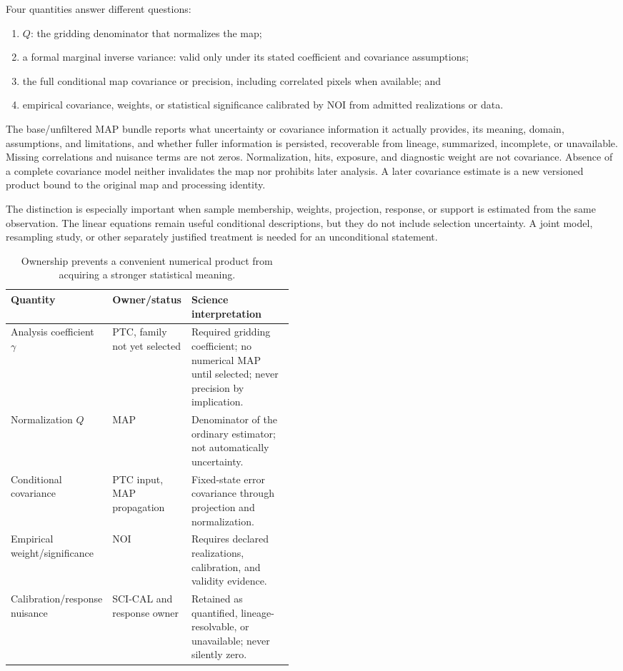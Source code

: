 \documentclass[10pt]{article}
\begin{document}
Four quantities answer different questions:
\begin{enumerate}
\item \(Q\): the gridding denominator that normalizes the map;
\item a formal marginal inverse variance: valid only under its stated
coefficient and covariance assumptions;
\item the full conditional map covariance or precision, including correlated
pixels when available; and
\item empirical covariance, weights, or statistical significance calibrated
by NOI from admitted realizations or data.
\end{enumerate}

The base/unfiltered MAP bundle reports what uncertainty or covariance information it
actually provides, its meaning, domain, assumptions, and limitations, and
whether fuller information is persisted, recoverable from lineage,
summarized, incomplete, or unavailable. Missing correlations and nuisance
terms are not zeros. Normalization, hits, exposure, and diagnostic weight are
not covariance. Absence of a complete covariance model neither invalidates the
map nor prohibits later analysis. A later covariance estimate is a new
versioned product bound to the original map and processing identity.

The distinction is especially important when sample membership, weights,
projection, response, or support is estimated from the same observation. The
linear equations remain useful conditional descriptions, but they do not
include selection uncertainty. A joint model, resampling study, or other
separately justified treatment is needed for an unconditional statement.

\begin{table}[h]
\centering\small
\begin{tabularx}{\linewidth}{@{}L{0.26\linewidth}L{0.20\linewidth}Y@{}}
\toprule Quantity & Owner/status & Science interpretation \\
\midrule
Analysis coefficient \(\gamma\) & PTC, family not yet selected & Required gridding coefficient; no numerical MAP until selected; never precision by implication.\\
Normalization \(Q\) & MAP & Denominator of the ordinary estimator; not automatically uncertainty.\\
Conditional covariance & PTC input, MAP propagation & Fixed-state error covariance through projection and normalization.\\
Empirical weight/significance & NOI & Requires declared realizations, calibration, and validity evidence.\\
Calibration/response nuisance & SCI-CAL and response owner & Retained as quantified, lineage-resolvable, or unavailable; never silently zero.\\
\bottomrule
\end{tabularx}
\caption{Ownership prevents a convenient numerical product from acquiring a stronger statistical meaning.}
\end{table}
\end{document}
